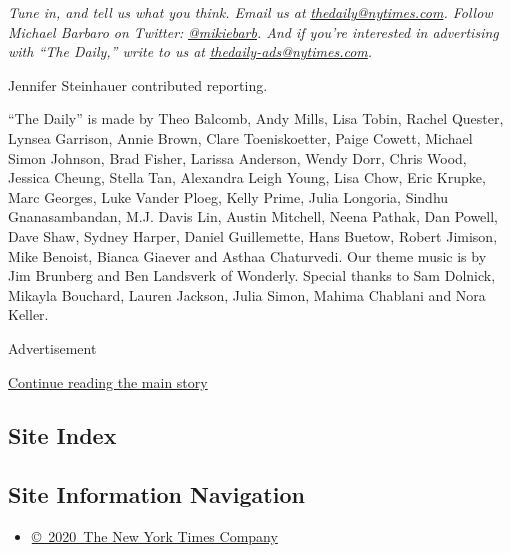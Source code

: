 \emph{Tune in, and tell us what you think. Email us at}
\href{mailto:thedaily@nytimes.com}{\emph{thedaily@nytimes.com}}\emph{.
Follow Michael Barbaro on Twitter:}
\href{https://twitter.com/mikiebarb}{\emph{@mikiebarb}}\emph{. And if
you're interested in advertising with ``The Daily,'' write to us at}
\href{mailto:thedaily-ads@nytimes.com}{\emph{thedaily-ads@nytimes.com}}\emph{.}

Jennifer Steinhauer contributed reporting.

``The Daily'' is made by Theo Balcomb, Andy Mills, Lisa Tobin, Rachel
Quester, Lynsea Garrison, Annie Brown, Clare Toeniskoetter, Paige
Cowett, Michael Simon Johnson, Brad Fisher, Larissa Anderson, Wendy
Dorr, Chris Wood, Jessica Cheung, Stella Tan, Alexandra Leigh Young,
Lisa Chow, Eric Krupke, Marc Georges, Luke Vander Ploeg, Kelly Prime,
Julia Longoria, Sindhu Gnanasambandan, M.J. Davis Lin, Austin Mitchell,
Neena Pathak, Dan Powell, Dave Shaw, Sydney Harper, Daniel Guillemette,
Hans Buetow, Robert Jimison, Mike Benoist, Bianca Giaever and Asthaa
Chaturvedi. Our theme music is by Jim Brunberg and Ben Landsverk of
Wonderly. Special thanks to Sam Dolnick, Mikayla Bouchard, Lauren
Jackson, Julia Simon, Mahima Chablani and Nora Keller.

Advertisement

\protect\hyperlink{after-bottom}{Continue reading the main story}

\hypertarget{site-index}{%
\subsection{Site Index}\label{site-index}}

\hypertarget{site-information-navigation}{%
\subsection{Site Information
Navigation}\label{site-information-navigation}}

\begin{itemize}
\tightlist
\item
  \href{https://help.nytimes.com/hc/en-us/articles/115014792127-Copyright-notice}{©~2020~The
  New York Times Company}
\end{itemize}

